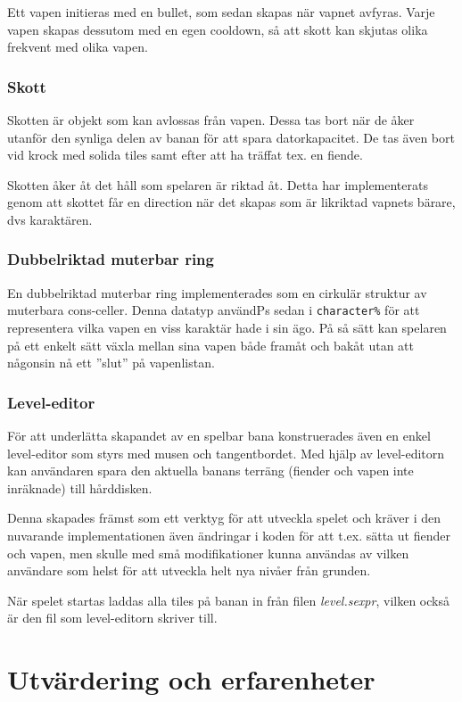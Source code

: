 \documentclass{scrartcl}
\newcommand{\code}[1]%
{\texttt{#1}}
\newcommand{\filename}[1]%
{\textsl{#1}}
\begin{document}
Ett vapen initieras med en bullet, som sedan skapas när vapnet avfyras. Varje vapen skapas dessutom med en egen cooldown, så att skott kan skjutas olika frekvent med olika vapen. 

\subsubsection{Skott}

Skotten är objekt som kan avlossas från vapen. Dessa tas bort när de åker utanför den synliga delen av banan för att spara datorkapacitet. De tas även bort vid krock med solida tiles samt efter att ha träffat tex. en fiende. 

Skotten åker åt det håll som spelaren är riktad åt. Detta har implementerats genom att skottet får en direction när det skapas som är likriktad vapnets bärare, dvs karaktären. 

\subsubsection{Dubbelriktad muterbar ring}

En dubbelriktad muterbar ring implementerades som en cirkulär struktur av muterbara cons-celler. Denna datatyp användPs sedan i \code{character\%} för att representera vilka vapen en viss karaktär hade i sin ägo. På så sätt kan spelaren på ett enkelt sätt växla mellan sina vapen både framåt och bakåt utan att någonsin nå ett ''slut'' på vapenlistan.

\subsubsection{Level-editor}
För att underlätta skapandet av en spelbar bana konstruerades även en enkel level-editor som styrs med musen och tangentbordet. Med hjälp av level-editorn kan användaren spara den aktuella banans terräng (fiender och vapen inte inräknade) till hårddisken.

Denna skapades främst som ett verktyg för att utveckla spelet och kräver i den nuvarande implementationen även ändringar i koden för att t.ex. sätta ut fiender och vapen, men skulle med små modifikationer kunna användas av vilken användare som helst för att utveckla helt nya nivåer från grunden.

När spelet startas laddas alla tiles på banan in från filen \filename{level.sexpr}, vilken också är den fil som level-editorn skriver till.

\section{Utvärdering och erfarenheter}
\end{document}
